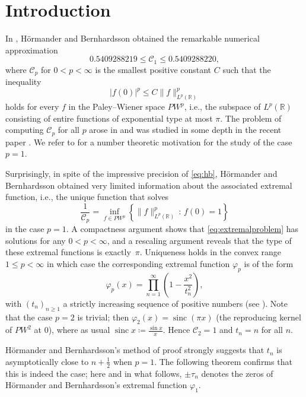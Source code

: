 \documentclass[12pt]{amsart}
\theoremstyle{plain}
\DeclareMathOperator{\sinc}{sinc}
\begin{document}
\section{Introduction}



In  \cite{HB93}, H\"{o}rmander and Bernhardsson obtained the remarkable numerical approximation 
\begin{equation}\label{eq:hb} 
	0.5409288219 \leq \mathscr{C}_1 \leq 0.5409288220,
\end{equation}
where $\mathscr{C}_p$ for $0<p<\infty$ is the smallest positive constant $C$ such that the inequality 
\begin{equation}\label{eq:pointeval} 
	|f(0)|^p \leq C \|f\|_{L^p(\mathbb R)}^p 
\end{equation}
holds for every $f$ in the Paley--Wiener space $PW^p$, i.e., the subspace of $L^p(\mathbb{R})$ consisting of entire functions of exponential type at most $\pi$. The problem of computing $\mathscr{C}_p$ for all $p$ arose in \cite{LL15, Lubinsky17} and was studied in some depth in the recent paper \cite{BCOS}. We refer to \cite{CMS19} for a number theoretic motivation for the study of the case $p=1$. 

Surprisingly, in spite of the impressive precision of  \eqref{eq:hb}, H\"{o}rmander and Bernhardsson obtained very limited information about the associated extremal function, i.e., the unique function that solves
\begin{equation}\label{eq:extremalproblem} 
	\frac{1}{\mathscr{C}_p} = \inf_{f \in PW^p} \left\{\|f\|_{L^p(\mathbb R)}^p \,: \, f(0) = 1\right\}
\end{equation}
in the case $p=1$. A compactness argument shows that \eqref{eq:extremalproblem} has solutions for any $0<p<\infty$, and a rescaling argument reveals that the type of these extremal functions is exactly~$\pi$. Uniqueness holds in the convex range $1 \leq p < \infty$ in which case the corresponding extremal function $\varphi_p$ is of the form
\[ \varphi_p(x) = \prod_{n=1}^\infty \left(1-\frac{x^2}{t_n^2}\right),\]
with $(t_n)_{n\geq1}$ a strictly increasing sequence of positive numbers (see \cite{HB93, LL15, BCOS}). Note that the case $p=2$ is trivial; then 
$\varphi_2(x)= \sinc(\pi x)$ (the reproducing kernel of $PW^2$ at $0$), where as usual $\sinc{x} \coloneqq  \frac{\sin{x}}{x}$. Hence $\mathscr{C}_2 = 1$ and $t_n=n$ for all $n$.

H\"{o}rmander and Bernhardsson's method of proof strongly suggests that $t_n$ is asymptotically close to $n+\frac12$ when $p=1$. The following theorem confirms that this is indeed the case; here and in what follows, $\pm \tau_n$ denotes the zeros of H\"{o}rmander and Bernhardsson's extremal function $\varphi_1$.
\end{document}
